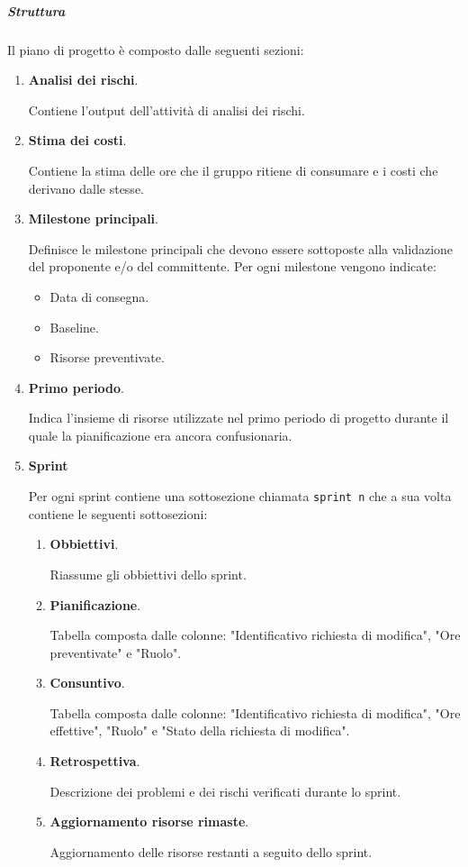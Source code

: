 \subparagraph{Struttura}
Il piano di progetto è composto dalle seguenti sezioni:
\begin{enumerate}
    \item \textbf{Analisi dei rischi}.
    
    Contiene l'output dell'attività di analisi dei rischi.

    \item \textbf{Stima dei costi}.
    
    Contiene la stima delle ore che il gruppo ritiene di consumare e i costi che derivano dalle stesse. 
    
    \item \textbf{Milestone principali}.
    
    Definisce le milestone principali che devono essere sottoposte alla validazione del proponente e/o del committente.
    Per ogni milestone vengono indicate:
    \begin{itemize}
        \item Data di consegna.
        \item Baseline.
        \item Risorse preventivate.
    \end{itemize}
    
    \item \textbf{Primo periodo}.
    
    Indica l'insieme di risorse utilizzate nel primo periodo di progetto durante il quale la pianificazione era ancora confusionaria.
    
    \item \textbf{Sprint}
    
    Per ogni sprint contiene una sottosezione chiamata \texttt{sprint n} che a sua volta contiene le seguenti sottosezioni:
    \begin{enumerate}
        \item \textbf{Obbiettivi}.
        
        Riassume gli obbiettivi dello sprint.

        \item \textbf{Pianificazione}.
        
        Tabella composta dalle colonne: "Identificativo richiesta di modifica", "Ore preventivate" e "Ruolo".

        \item \textbf{Consuntivo}.
        
        Tabella composta dalle colonne: "Identificativo richiesta di modifica", "Ore effettive", "Ruolo" e "Stato della richiesta di modifica".
        
        \item \textbf{Retrospettiva}.
        
        Descrizione dei problemi e dei rischi verificati durante lo sprint.

        \item \textbf{Aggiornamento risorse rimaste}.
        
        Aggiornamento delle risorse restanti a seguito dello sprint.
    \end{enumerate}

\end{enumerate}